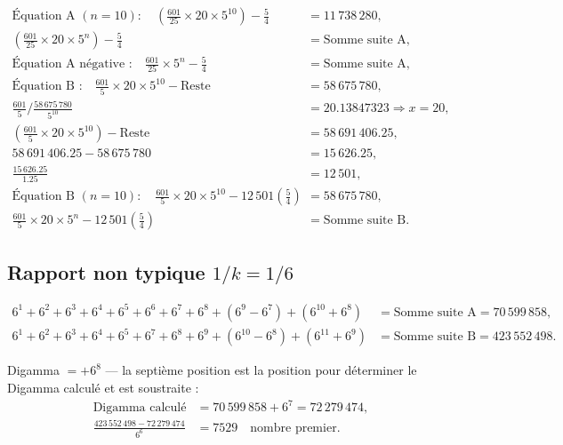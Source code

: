 \documentclass[11pt,a4paper]{article}
\begin{document}
\begin{boitenote}
\begin{boitenote}[Inspiration]
\begin{boitenote}
\vspace{0.3cm}
\begin{boiteformule}
\begin{align*}
\text{Équation A }(n=10):\quad
\left(\frac{601}{25}\times20\times5^{10}\right)-\frac{5}{4}
&=11\,738\,280,\\
\left(\frac{601}{25}\times20\times5^{n}\right)-\frac{5}{4}
&=\text{Somme suite A},\\
\text{Équation A négative :}\quad
\frac{601}{25}\times5^{n}-\frac{5}{4}
&=\text{Somme suite A},\\
\text{Équation B :}\quad
\frac{601}{5}\times20\times5^{10}-\text{Reste}
&=58\,675\,780,\\
\frac{601}{5}\Big/\frac{58\,675\,780}{5^{10}}
&=20.13847323\Rightarrow x=20,\\
\left(\frac{601}{5}\times20\times5^{10}\right)-\text{Reste}
&=58\,691\,406.25,\\
58\,691\,406.25-58\,675\,780 &=15\,626.25,\\
\frac{15\,626.25}{1.25} &=12\,501,\\
\text{Équation B }(n=10):\quad
\frac{601}{5}\times20\times5^{10}
-12\,501\left(\frac{5}{4}\right)
&=58\,675\,780,\\
\frac{601}{5}\times20\times5^{n}
-12\,501\left(\frac{5}{4}\right)
&=\text{Somme suite B}.
\end{align*}
\end{boiteformule}

\subsection{Rapport non typique $1/k = 1/6$}

\vspace{0.3cm}
\begin{boiteformule}[Sommes des suites A et B --- rapport $1/6$, $n = 10$]
\begin{align*}
6^{1}+6^{2}+6^{3}+6^{4}+6^{5}+6^{6}+6^{7}+6^{8}+(6^{9}-6^{7})+(6^{10}+6^{8})
  &= \text{Somme suite A} = 70\,599\,858,\\
6^{1}+6^{2}+6^{3}+6^{4}+6^{5}+6^{7}+6^{8}+6^{9}+(6^{10}-6^{8})+(6^{11}+6^{9})
  &= \text{Somme suite B} = 423\,552\,498.
\end{align*}
\end{boiteformule}

Digamma $= +6^{8}$ --- la septième position est la position pour déterminer le
Digamma calculé et est soustraite :
\begin{align*}
\text{Digamma calculé} &=70\,599\,858+6^{7}=72\,279\,474,\\
\frac{423\,552\,498-72\,279\,474}{6^{6}}
&=7529\quad\text{nombre premier}.
\end{align*}


\end{boitenote}
\end{boitenote}
\end{boitenote}
\end{document}
